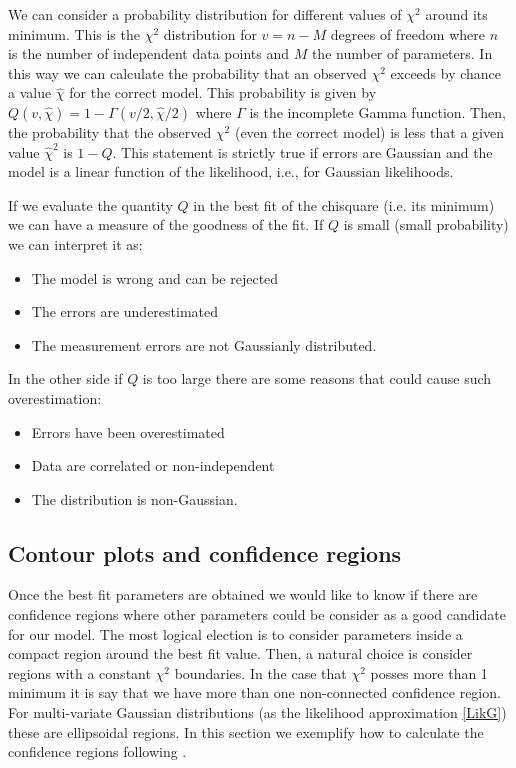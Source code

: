 \documentclass[onecolumn,           %
               showpacs,            %
               preprintnumbers,     %
               aps,                 %
               prl,          	    %
               letterpaper,             %
               superscriptaddress,      %
               nofootinbib,         %
               tightenlines,        %
               floats,floatfix      %
               ,usenatbib,
               ]{revtex4-1}
\begin{document}
We can consider a probability distribution for different values of $\chi^2$ around its minimum. This is the $\chi^2$ distribution for $v=n-M$ degrees of freedom where $n$ is the number of independent data points and $M$ the number of parameters. In this way we can calculate the probability that an observed $\chi^2$ exceeds by chance a value $\hat \chi$ for the correct model. This probability is given by \cite{NR} $Q(v,\hat\chi)=1-\Gamma(v/2,\hat\chi/2)$ where $\Gamma$ is the incomplete Gamma function. Then, the probability that the observed $\chi^2$ (even the correct model) is less that a given value $\hat\chi^2$ is $1-Q$. This statement is strictly true if errors are Gaussian and the model is a linear function of the likelihood, i.e., for Gaussian likelihoods.

If we evaluate the quantity $Q$ in the best fit of the chisquare (i.e. its minimum) we can have a measure of the goodness of the fit. If $Q$ is small (small probability) we can interpret it as:
\begin{itemize}
\item The model is wrong and can be rejected
\item The errors are underestimated 
\item The measurement errors are not Gaussianly distributed.
\end{itemize}
In the other side if $Q$ is too large there are some reasons that could cause such overestimation:
\begin{itemize}
\item Errors have been overestimated
\item Data are correlated or non-independent
\item The distribution is non-Gaussian.
\end{itemize}
\subsection{Contour plots and confidence regions}

Once the best fit parameters are obtained we would like to know if there are confidence regions where other parameters could be consider as a good candidate for our model. The most logical election is to consider parameters inside a compact region around the best fit value. Then, a natural choice is consider regions with a constant $\chi^2$ boundaries. In the case that $\chi^2$ posses more than 1 minimum it is say that we have more than one non-connected confidence region. For multi-variate Gaussian distributions (as the likelihood approximation \eqref{LikG}) these are ellipsoidal regions. In this section we exemplify how to calculate the confidence regions following \cite{LiV}. 
\end{document}
